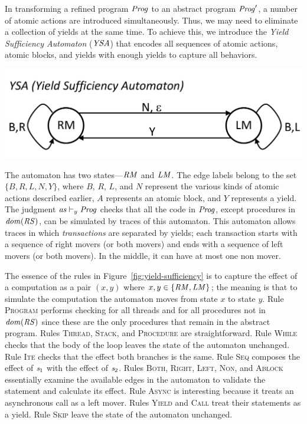 In transforming a refined program $\mathit{Prog}$ to an abstract program $\mathit{Prog}'$, a number of atomic actions 
are introduced simultaneously.
Thus, we may need to eliminate a collection of yields at the same time.
To achieve this, we introduce the {\em Yield Sufficiency Automaton\/} ($\mathit{YSA}$) that encodes 
all sequences of atomic actions, atomic blocks, and yields with enough yields to capture all behaviors.
\begin{center}
\includegraphics[scale=0.35]{YieldTypeCheckingAutomaton.pdf}
\end{center}
The automaton has two states---$\mathit{RM}$ and $\mathit{LM}$.
The edge labels belong to the set $\{B,R,L,N,Y\}$, where $B$, $R$, $L$, and $N$ represent the various kinds 
of atomic actions described earlier, $A$ represents an atomic block, and $Y$ represents a yield.
The judgment $\mathit{as} \vdash_y \mathit{Prog}$ checks that all the code in $\mathit{Prog}$, except procedures in $\mathit{dom}(\mathit{RS})$,
can be simulated by traces of this automaton.
This automaton allows traces in which {\em transactions\/} are separated by yields;
each transaction starts with a sequence of right movers (or both movers) and ends with a sequence of left movers (or both movers).
In the middle, it can have at most one non mover.

The essence of the rules in Figure~\ref{fig:yield-sufficiency}
is to capture the effect of a computation as a pair $(x,y)$ where $x,y \in \{\mathit{RM},\mathit{LM}\}$;
the meaning is that to simulate the computation the automaton moves from state $x$ to state $y$.
Rule \textsc{Program} performs checking for all threads and for all procedures not in $\mathit{dom}(\mathit{RS})$ since these are the 
only procedures that remain in the abstract program.
Rules \textsc{Thread}, \textsc{Stack}, and \textsc{Procedure} are straightforward.
Rule \textsc{While} checks that the body of the loop leaves the state of the automaton unchanged.
Rule \textsc{Ite} checks that the effect both branches is the same.
Rule \textsc{Seq} composes the effect of $\mathit{s}_1$ with the effect of $\mathit{s}_2$.
Rules \textsc{Both}, \textsc{Right}, \textsc{Left}, \textsc{Non}, and \textsc{Ablock} essentially 
examine the available edges in the automaton to validate the statement and calculate its effect.
Rule \textsc{Async} is interesting because it treats an asynchronous call as a left mover.
Rules \textsc{Yield} and \textsc{Call} treat their statements as a yield.
Rule \textsc{Skip} leave the state of the automaton unchanged.

